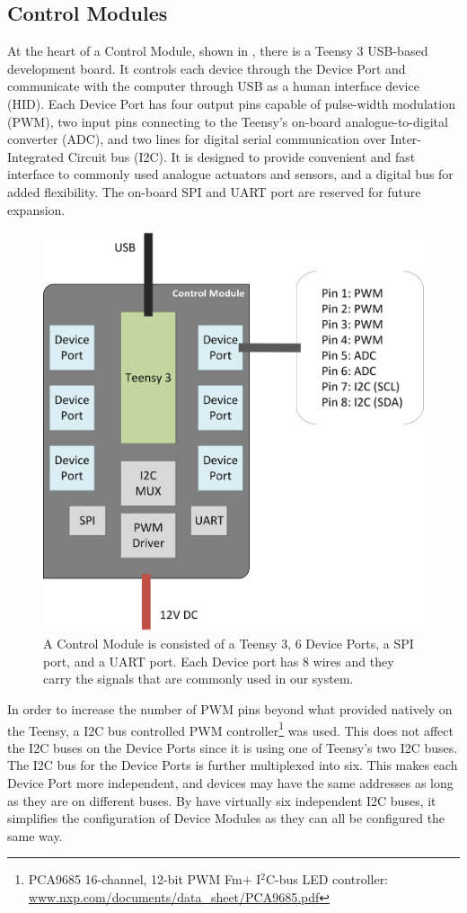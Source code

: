 \subsection{Control Modules}\label{subsec:controller}

At the heart of a Control Module, shown in , there is a Teensy 3 USB-based development board. It controls each device through the Device Port and communicate with the computer through USB as a human interface device (HID). Each Device Port has four output pins capable of pulse-width modulation (PWM), two input pins connecting to the Teensy's on-board analogue-to-digital converter (ADC), and two lines for digital serial communication over Inter-Integrated Circuit bus (I2C). It is designed to provide convenient and fast interface to commonly used analogue actuators and sensors, and a digital bus for added flexibility. The on-board SPI and UART port  are reserved for future expansion.

\begin{figure}[!htbp]
	\centering
	\includegraphics[width=0.68 \textwidth]{"fig/interactive control system/Control_Module"}
	\caption[Block diagram of the Control Module]{A Control Module is consisted of a Teensy 3, 6 Device Ports, a SPI port, and a UART port. Each Device port has 8 wires and they carry the signals that are commonly used in our system.}
	\label{fig:Control_Module}
\end{figure}

In order to increase the number of PWM pins beyond what provided natively on the Teensy, a I2C bus controlled PWM controller\footnote{PCA9685 16-channel, 12-bit PWM Fm$+$ I$^2$C-bus LED controller: \url{www.nxp.com/documents/data_sheet/PCA9685.pdf}} was used. This does not affect the I2C buses on the Device Ports since it is using one of Teensy's two I2C buses. The I2C bus for the Device Ports is further multiplexed into six. This makes each Device Port more independent, and devices may have the same addresses as long as they are on different buses. By have virtually six independent I2C buses, it simplifies the configuration of Device Modules as they can all be configured the same way.

